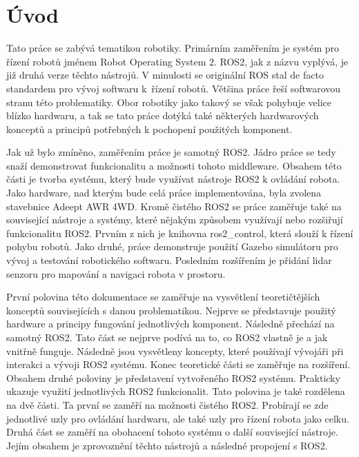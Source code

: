 
%

\chapter{Úvod} %
Tato práce se zabývá tematikou robotiky. Primárním zaměřením je systém pro řízení robotů jménem Robot Operating System 2. ROS2, jak z názvu vyplývá, je již druhá verze těchto nástrojů. V minulosti se originální ROS stal de facto standardem pro vývoj softwaru k~řízení robotů. Většina práce řeší softwarovou stranu této problematiky. Obor robotiky jako takový se však pohybuje velice blízko hardwaru, a tak se tato práce dotýká také některých hardwarových konceptů a principů potřebných k pochopení použitých komponent.

Jak už bylo zmíněno, zaměřením práce je samotný ROS2. Jádro práce se tedy snaží demonstrovat funkcionalitu a možnosti tohoto middleware. Obsahem této části je tvorba systému, který bude využívat nástroje ROS2 k ovládání robota. Jako hardware, nad kterým bude celá práce implementována, byla zvolena stavebnice Adeept AWR 4WD. Kromě čistého ROS2 se práce zaměřuje také na související nástroje a systémy, které nějakým způsobem využívají nebo rozšiřují funkcionalitu ROS2. Prvním z nich je knihovna ros2\_control, která slouží k řízení pohybu robotů. Jako druhé, práce demonstruje použití Gazebo simulátoru pro vývoj a testování robotického softwaru. Posledním rozšířením je přidání lidar senzoru pro mapování a navigaci robota v prostoru.

První polovina této dokumentace se zaměřuje na vysvětlení teoretičtějších konceptů souvisejících s danou problematikou. Nejprve se představuje použitý hardware a principy fungování jednotlivých komponent. Následně přechází na samotný ROS2. Tato část se nejprve podívá na to, co ROS2 vlastně je a jak vnitřně funguje. Následně jsou vysvětleny koncepty, které používají vývojáři při interakci a vývoji ROS2 systému. Konec teoretické části se zaměřuje na rozšíření.
Obsahem druhé poloviny je představení vytvořeného ROS2 systému. Prakticky ukazuje využití jednotlivých ROS2 funkcionalit. Tato polovina je také rozdělena na dvě části. Ta první se zaměří na možnosti čistého ROS2. Probírají se zde jednotlivé uzly pro ovládání hardwaru, ale také uzly pro řízení robota jako celku. Druhá část se zaměří na obohacení tohoto systému o další související nástroje. Jejím obsahem je zprovoznění těchto nástrojů a následné propojení s ROS2.


